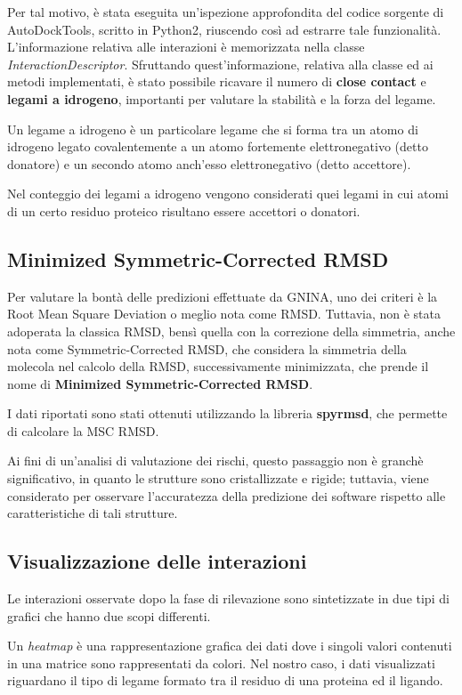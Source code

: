 Per tal motivo, è stata eseguita un'ispezione approfondita del codice sorgente di AutoDockTools, scritto in Python2, riuscendo così ad estrarre tale funzionalità. L'informazione relativa alle interazioni è memorizzata nella classe \textit{InteractionDescriptor}. Sfruttando quest'informazione, relativa alla classe ed ai metodi implementati, è stato possibile ricavare il numero di \textbf{close contact} e \textbf{legami a idrogeno}, importanti per valutare la stabilità e la forza del legame.

Un legame a idrogeno è un particolare legame che si forma tra un atomo di idrogeno legato covalentemente a un atomo fortemente elettronegativo (detto donatore) e un secondo atomo anch’esso elettronegativo (detto accettore). 

Nel conteggio dei legami a idrogeno vengono considerati quei legami in cui atomi di un certo residuo proteico risultano essere accettori o donatori.

\subsection{Minimized Symmetric-Corrected RMSD} \label{mscrmsd}
Per valutare la bontà delle predizioni effettuate da GNINA, uno dei criteri è la Root Mean Square Deviation o meglio nota come RMSD. Tuttavia, non è stata adoperata la classica RMSD, bensì quella con la correzione della simmetria, anche nota come Symmetric-Corrected RMSD, che considera la simmetria della molecola nel calcolo della RMSD, successivamente minimizzata, che prende il nome di \textbf{Minimized Symmetric-Corrected RMSD}.

I dati riportati sono stati ottenuti utilizzando la libreria \textbf{spyrmsd}, che permette di calcolare la MSC RMSD. 

Ai fini di un'analisi di valutazione dei rischi, questo passaggio non è granchè significativo, in quanto le strutture sono cristallizzate e rigide; tuttavia, viene considerato per osservare l'accuratezza della predizione dei software rispetto alle caratteristiche di tali strutture.
\subsection{Visualizzazione delle interazioni} \label{charts}
Le interazioni osservate dopo la fase di rilevazione sono sintetizzate in due tipi di grafici che hanno due scopi differenti.

Un \textit{heatmap} è una rappresentazione grafica dei dati dove i singoli valori contenuti in una matrice sono rappresentati da colori. Nel nostro caso, i dati visualizzati riguardano il tipo di legame formato tra il residuo di una proteina ed il ligando. 


